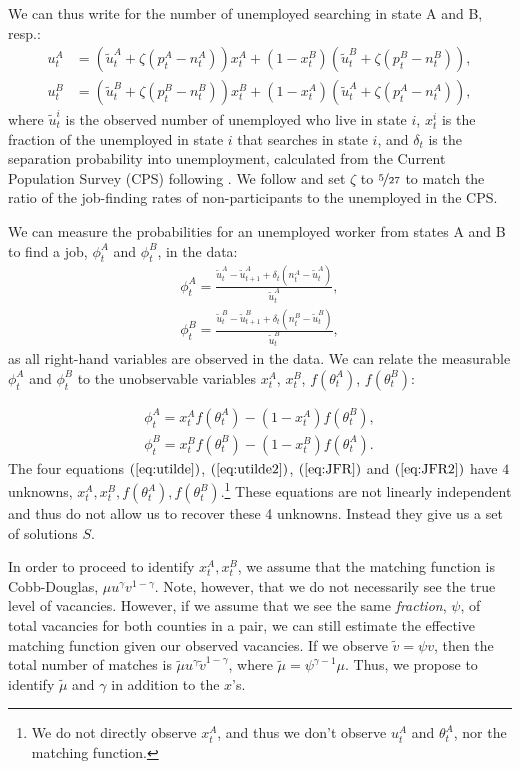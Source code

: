 \documentclass[12pt]{article}
\newcommand{\1}{\mathbf{1}}
\newcommand{\xat}{x^A_t}
\newcommand{\xbt}{x^B_t}
\newcommand{\tat}{\theta^A_t}
\newcommand{\tbt}{\theta^B_t}
\newcommand{\uat}{u^A_t}
\newcommand{\ubt}{u^B_t}
\newcommand{\uatt}{\tilde{u}^A_t}
\newcommand{\ubtt}{\tilde{u}^B_t}
\newcommand{\uattp}{\tilde{u}^A_{t+1}}
\newcommand{\ubttp}{\tilde{u}^B_{t+1}}
\newcommand{\nat}{n^A_t}
\newcommand{\nbt}{n^B_t}
\newcommand{\pat}{p^A_t}
\newcommand{\pbt}{p^B_t}
\begin{document}
\begin{appendix}
We can thus write for the number of unemployed searching in state A and B, resp.:
\begin{align} \label{eq:utilde}
\uat&=(\uatt+\zeta(\pat-\nat))\xat+(1-\xbt)(\ubtt+\zeta(\pbt-\nbt)),\\
\ubt&=(\ubtt+\zeta(\pbt-\nbt))\xbt+(1-\xat)(\uatt+\zeta(\pat-\nat)), \label{eq:utilde2}
\end{align}
where $\tilde{u}^{i}_{t}$ is the observed number of unemployed who live in state $i$, $x^{i}_{t}$ is the fraction of the unemployed in state $i$ that searches in state $i$, and $\delta_t$ is the separation probability into unemployment, calculated from the Current Population Survey (CPS) following \citet{shimer:05b}.  We follow \citet{hall:13} and set $\zeta$ to $\nicefrac{5}{27}$ to match the ratio of the job-finding rates of non-participants to the unemployed in the CPS.




We can measure the probabilities for an unemployed worker from states A and B to find a job, $\phi_t^A$ and $\phi_t^B$, in the data:
\begin{align} \label{eq:JFR_Data}
\phi_t^A = \frac{\uatt-\uattp+\delta_t \left(\nat-\uatt\right)}{\uatt} ,\\
\phi_t^B = \frac{\ubtt-\ubttp + \delta_t \left(\nbt-\ubtt\right) }{\ubtt},
\end{align}
as all right-hand variables are observed in the data.
We can relate the measurable $\phi_t^A$ and $\phi_t^B$ to the unobservable variables $\xat$, $\xbt$, $f(\tat)$, $f(\tbt)$:

\begin{align} \label{eq:JFR}
\phi_t^A = \xat f\left(\tat\right)-\left(1-\xat\right) f\left(\tbt\right),\\
\phi_t^B = \xbt f\left(\tbt\right)-\left(1-\xbt\right) f\left(\tat\right).\label{eq:JFR2}
\end{align}
The four equations $(\ref{eq:utilde})$, $(\ref{eq:utilde2})$, $(\ref{eq:JFR})$ and $(\ref{eq:JFR2})$ have $4$ unknowns, $\xat, \xbt, f(\tat), f(\tbt)$.\footnote{We do not directly observe $\xat$, and thus we don't observe $\uat$ and $\tat$, nor the matching function.} These equations are not linearly independent and thus do not allow us to recover these 4 unknowns. Instead they give us a set of solutions $S$.

In order to proceed to identify $\xat,\xbt$, we assume that the matching function is Cobb-Douglas, $\mu u^\gamma v^{1-\gamma}$.   Note, however, that we do not necessarily see the true level of vacancies.  However, if we assume that we see the same \textit{fraction}, $\psi$, of total vacancies for both counties in a pair, we can still estimate the effective matching function given our observed vacancies.  If we observe $\tilde{v}=\psi v$, then the total number of matches is $\tilde{\mu} u^\gamma \tilde{v}^{1-\gamma}$, where $\tilde{\mu}=\psi^{\gamma-1}\mu$.  Thus, we propose to identify $\tilde{\mu}$ and $\gamma$ in addition to the $x$'s.


\end{appendix}
\end{document}
